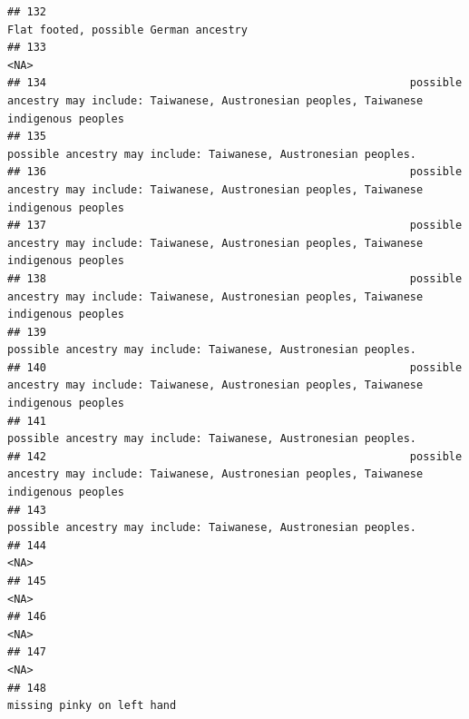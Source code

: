\documentclass[]{article}
\begin{document}
\begin{verbatim}
## 132                                                                                                               Flat footed, possible German ancestry
## 133                                                                                                                                                <NA>
## 134                                                        possible ancestry may include: Taiwanese, Austronesian peoples, Taiwanese indigenous peoples
## 135                                                                                     possible ancestry may include: Taiwanese, Austronesian peoples.
## 136                                                        possible ancestry may include: Taiwanese, Austronesian peoples, Taiwanese indigenous peoples
## 137                                                        possible ancestry may include: Taiwanese, Austronesian peoples, Taiwanese indigenous peoples
## 138                                                        possible ancestry may include: Taiwanese, Austronesian peoples, Taiwanese indigenous peoples
## 139                                                                                     possible ancestry may include: Taiwanese, Austronesian peoples.
## 140                                                        possible ancestry may include: Taiwanese, Austronesian peoples, Taiwanese indigenous peoples
## 141                                                                                     possible ancestry may include: Taiwanese, Austronesian peoples.
## 142                                                        possible ancestry may include: Taiwanese, Austronesian peoples, Taiwanese indigenous peoples
## 143                                                                                     possible ancestry may include: Taiwanese, Austronesian peoples.
## 144                                                                                                                                                <NA>
## 145                                                                                                                                                <NA>
## 146                                                                                                                                                <NA>
## 147                                                                                                                                                <NA>
## 148                                                                                                                          missing pinky on left hand

\end{verbatim}
\end{document}
